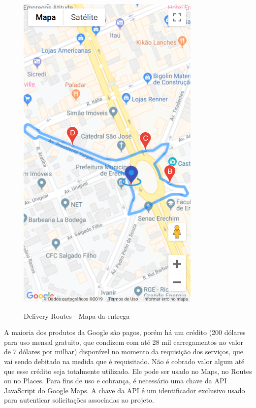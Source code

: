 \newpage
\begin{figure}[H]
    \centering
    \caption{Delivery Routes - Mapa da entrega}
    \includegraphics[width=0.8\textwidth]{./dados/figuras/fig27}
    \label{fig:drRotaEntrega}
\end{figure}

\newpage
A maioria dos produtos da Google são pagos, porém há um crédito (200 dólares para uso mensal gratuito, que condizem com até 28 mil carregamentos no valor de 7 dólares por milhar) disponível no momento da requisição dos serviços, que vai sendo debitado na medida que é requisitado. Não é cobrado valor algum até que esse crédito seja totalmente utilizado. Ele pode ser usado no Maps, no Routes ou no Places. Para fins de uso e cobrança, é necessário uma chave da API JavaScript do Google Maps. A chave da API é um identificador exclusivo usado para autenticar solicitações associadas ao projeto.

